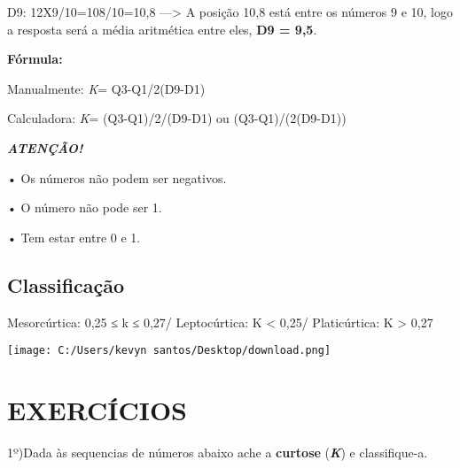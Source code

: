 \documentclass[]{book}
\begin{document}
D9: 12X9/10=108/10=10,8 ---\textgreater{} A posição 10,8 está entre os números 9 e 10, logo a resposta será a média aritmética entre eles, \textbf{D9 = 9,5}.

\textbf{Fórmula:}

Manualmente: \emph{K}= Q3-Q1/2(D9-D1)

Calculadora: \emph{K}= (Q3-Q1)/2/(D9-D1) ou (Q3-Q1)/(2(D9-D1))

\textbf{\emph{ATENÇÃO!}}

• Os números não podem ser negativos.

• O número não pode ser 1.

• Tem estar entre 0 e 1.

\hypertarget{classificacao}{%
\subsection{Classificação}\label{classificacao}}

Mesorcúrtica: 0,25 ≤ k ≤ 0,27/ Leptocúrtica: K \textless{} 0,25/ Platicúrtica: K \textgreater{} 0,27

\texttt{[image: C:/Users/kevyn santos/Desktop/download.png]}

\hypertarget{exercicios}{%
\section{\texorpdfstring{\textbf{EXERCÍCIOS}}{EXERCÍCIOS}}\label{exercicios}}

1º)Dada às sequencias de números abaixo ache a \textbf{curtose} (\textbf{\emph{K}}) e classifique-a.
\end{document}
